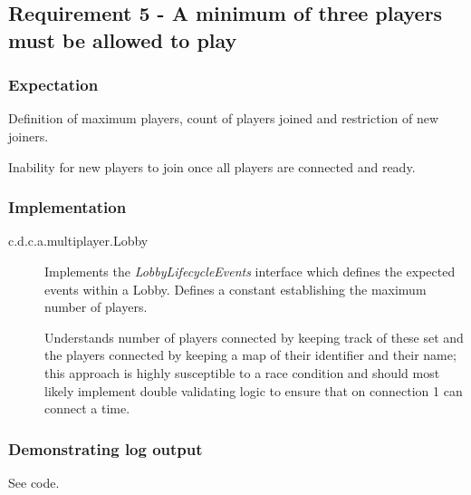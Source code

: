 \subsection{Requirement 5 - A minimum of three players must be allowed to play} 

\subsubsection{Expectation} 
Definition of maximum players, count of players joined and restriction of new joiners.

Inability for new players to join once all players are connected and ready.

\subsubsection{Implementation}

\begin{description}
	\item[c.d.c.a.multiplayer.Lobby] Implements the \textit{LobbyLifecycleEvents} interface which defines the expected events within a Lobby. Defines a constant establishing the maximum number of players. 
	
	Understands number of players connected by keeping track of these set and the players connected by keeping a map of their identifier and their name; this approach is highly susceptible to a race condition and should most likely implement double validating logic to ensure that on connection 1 can connect a time. 
\end{description}

\subsubsection{Demonstrating log output} 

See code.